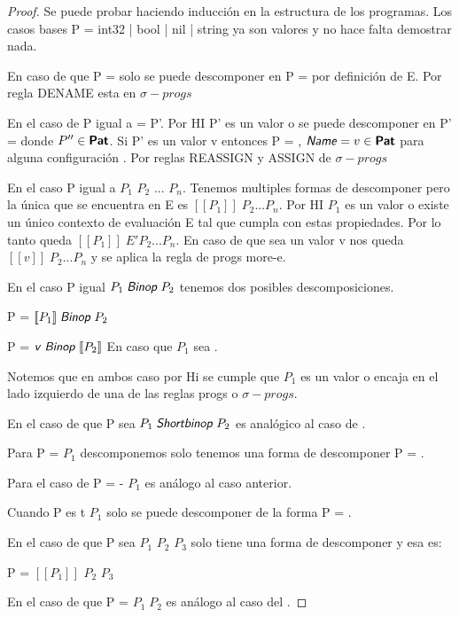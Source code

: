 \begin{proof}
Se puede probar haciendo inducción en la estructura de los programas.
Los casos bases P = int32 | bool | nil | string ya son valores y no hace falta demostrar nada.

En caso de que P =  solo se puede descomponer en P =  por definición de E. Por regla DENAME esta en $\sigma-progs$

En el caso de P igual a  = P'.
Por HI P' es un valor o se puede descomponer en P' = 
donde $P'' \in \textsf{\textbf{Pat}}$.
Si P' es un valor v entonces P = , $\textsf{\textit{Name}} = v \in \textsf{\textbf{Pat}}$ para alguna configuración .
Por reglas REASSIGN y ASSIGN de $\sigma-progs$

En el caso P igual a $P_{1}$ $P_{2}$ ... $P_{n}$. Tenemos multiples formas de descomponer pero la única que se encuentra en E es
$[\![P_{1}]\!] \; P_{2} ... P_{n}$. Por HI $P_{1}$ es un valor o existe un único contexto de evaluación E tal que cumpla con estas propiedades.
Por lo tanto queda $[\![P_{1}]\!] \; E' P_{2} ... P_{n}$. En caso de que sea un valor v nos queda $[\![v]\!] \; P_{2} ... P_{n}$ y se aplica la regla de progs more-e.

En el caso P igual $P_{1} \; \textsf{\textit{Binop}} \; P_{2}$ tenemos dos posibles descomposiciones.

P = $[\![P_{1}]\!] \; \textsf{\textit{Binop}} \; P_{2}$ 

P = $\textsf{\textit{v}} \; \textsf{\textit{Binop}} \; [\![P_{2}]\!]$ En caso que $P_{1}$ sea .

Notemos que en ambos caso por Hi se cumple que $P_{1}$ es un valor o encaja en el lado izquierdo de una de las reglas progs o $\sigma-progs$.

En el caso de que P sea $P_{1} \; \textsf{\textit{Shortbinop}} \; P_{2}$ es analógico al caso de .

Para P =  $P_{1}$ descomponemos solo tenemos una forma de descomponer P = .

Para el caso de P = - $P_{1}$ es análogo al caso anterior.

Cuando P es  t $P_{1}$ solo se puede descomponer de la forma P = .

En el caso de que P sea  $P_{1}$  $P_{2}$  $P_{3}$ solo tiene una forma de descomponer y esa es:

P =  $[\![P_{1}]\!]$  $P_{2}$  $P_{3}$

En el caso de que P =  $P_{1} \; P_{2}$ es análogo al caso del .




\end{proof}